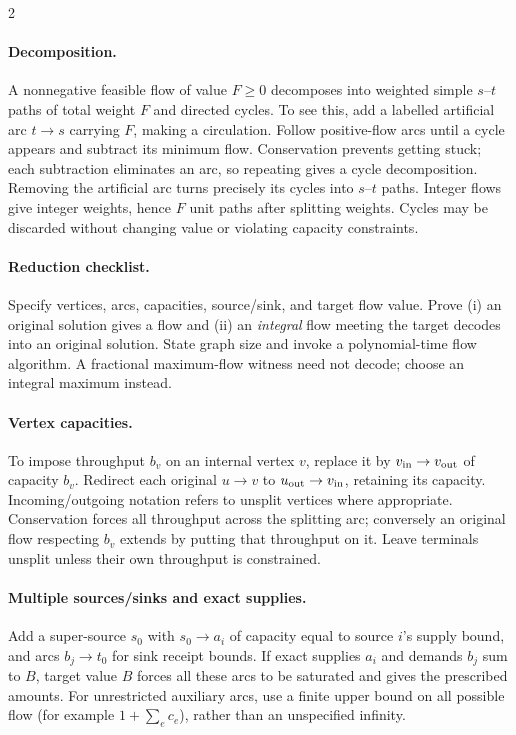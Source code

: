 \documentclass[10pt]{article}
\theoremstyle{definition}
\begin{document}
\begin{multicols*}{2}
\paragraph{Decomposition.}
A nonnegative feasible flow of value $F\ge0$ decomposes into weighted simple
$s$--$t$ paths of total weight $F$ and directed cycles. To see this, add a
labelled artificial arc $t\to s$ carrying $F$, making a circulation.
Follow positive-flow arcs until a cycle appears and subtract its minimum
flow. Conservation prevents getting stuck; each subtraction eliminates an
arc, so repeating gives a cycle decomposition. Removing the artificial arc
turns precisely its cycles into $s$--$t$ paths. Integer flows give integer
weights, hence $F$ unit paths after splitting weights. Cycles may be discarded
without changing value or violating capacity constraints.

\paragraph{Reduction checklist.}
Specify vertices, arcs, capacities, source/sink, and target flow value.
Prove (i) an original solution gives a flow and (ii) an \emph{integral} flow
meeting the target decodes into an original solution. State graph size and
invoke a polynomial-time flow algorithm. A fractional maximum-flow witness
need not decode; choose an integral maximum instead.

\paragraph{Vertex capacities.}
To impose throughput $b_v$ on an internal vertex $v$, replace it by
$v_{\rm in}\to v_{\rm out}$ of capacity $b_v$. Redirect each original
$u\to v$ to $u_{\rm out}\to v_{\rm in}$, retaining its capacity.
Incoming/outgoing notation refers to unsplit vertices where appropriate.
Conservation forces all throughput across the splitting arc; conversely an
original flow respecting $b_v$ extends by putting that throughput on it.
Leave terminals unsplit unless their own throughput is constrained.

\paragraph{Multiple sources/sinks and exact supplies.}
Add a super-source $s_0$ with $s_0\to a_i$ of capacity equal to source $i$'s
supply bound, and arcs $b_j\to t_0$ for sink receipt bounds.
If exact supplies $a_i$ and demands $b_j$ sum to $B$, target value $B$ forces
all these arcs to be saturated and gives the prescribed amounts.
For unrestricted auxiliary arcs, use a finite upper bound on all possible
flow (for example $1+\sum_e c_e$), rather than an unspecified infinity.


\end{multicols*}
\end{document}
